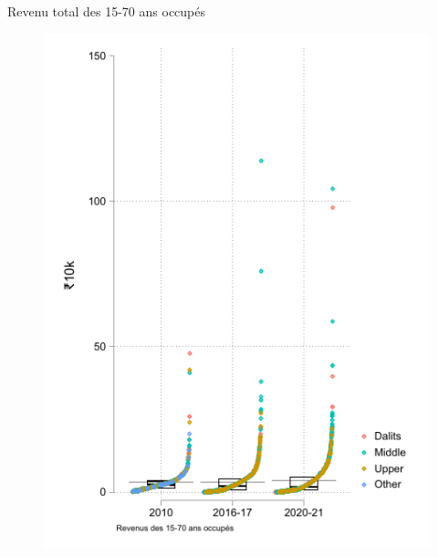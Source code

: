 \documentclass[aspectratio=169]{beamer}
\begin{document}
\begin{frame}[plain, shrink=2]{Revenu total des 15-70 ans occupés}
\begin{figure}[htpb]
\centering
\includegraphics[scale=0.9]{INPUT/inc_indiv.pdf}
\end{figure}
\end{frame}
\end{document}
